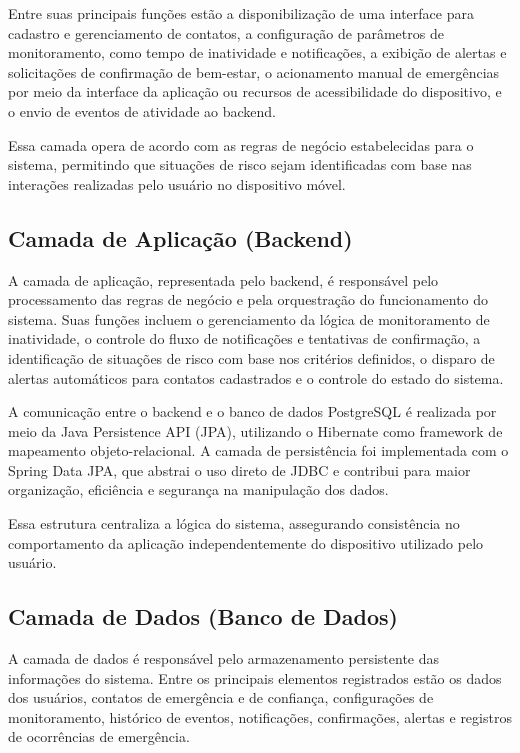 Entre suas principais funções estão a disponibilização de uma interface para cadastro e gerenciamento de contatos, a configuração de parâmetros de monitoramento, como tempo de inatividade e notificações, a exibição de alertas e solicitações de confirmação de bem-estar, o acionamento manual de emergências por meio da interface da aplicação ou recursos de acessibilidade do dispositivo, e o envio de eventos de atividade ao backend.

Essa camada opera de acordo com as regras de negócio estabelecidas para o sistema, permitindo que situações de risco sejam identificadas com base nas interações realizadas pelo usuário no dispositivo móvel.

\subsection{Camada de Aplicação (Backend)}

A camada de aplicação, representada pelo backend, é responsável pelo processamento das regras de negócio e pela orquestração do funcionamento do sistema. Suas funções incluem o gerenciamento da lógica de monitoramento de inatividade, o controle do fluxo de notificações e tentativas de confirmação, a identificação de situações de risco com base nos critérios definidos, o disparo de alertas automáticos para contatos cadastrados e o controle do estado do sistema.

A comunicação entre o backend e o banco de dados PostgreSQL é realizada por meio da Java Persistence API (JPA), utilizando o Hibernate como framework de mapeamento objeto-relacional. A camada de persistência foi implementada com o Spring Data JPA, que abstrai o uso direto de JDBC e contribui para maior organização, eficiência e segurança na manipulação dos dados.

Essa estrutura centraliza a lógica do sistema, assegurando consistência no comportamento da aplicação independentemente do dispositivo utilizado pelo usuário.

\subsection{Camada de Dados (Banco de Dados)}

A camada de dados é responsável pelo armazenamento persistente das informações do sistema. Entre os principais elementos registrados estão os dados dos usuários, contatos de emergência e de confiança, configurações de monitoramento, histórico de eventos, notificações, confirmações, alertas e registros de ocorrências de emergência.


